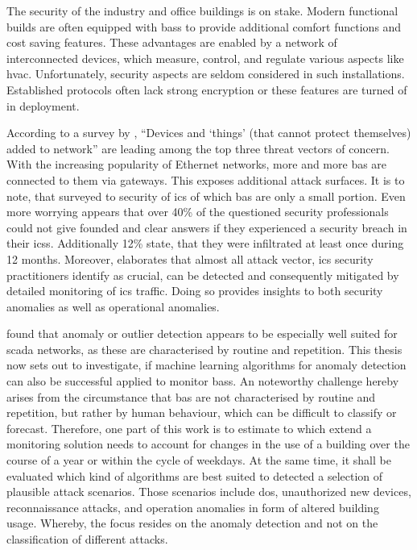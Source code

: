
The security of the industry and office buildings is on stake.
Modern functional builds are often equipped with \glspl{bas} to provide additional comfort functions and cost saving features.
These advantages are enabled by a network of interconnected devices, which measure, control, and regulate various aspects like \gls{hvac}.
Unfortunately, security aspects are seldom considered in such installations. \parencite{Brandstetter2017}
Established protocols often lack strong encryption or these features are turned of in deployment.

According to a survey by \textcite{Gregory-Brown2017}, \enquote{Devices and \enquote{things} (that cannot protect themselves) added to network} are leading among the top three threat vectors of concern.
With the increasing popularity of Ethernet networks, more and more \gls{bas} are connected to them via gateways. This exposes additional attack surfaces.
It is to note, that \textcite{Gregory-Brown2017} surveyed to security of \gls{ics} of which \gls{bas} are only a small portion.
Even more worrying appears that over 40\% of the questioned security professionals could not give founded and clear answers if they experienced a security breach in their \glspl{ics}. Additionally 12\% state, that they were infiltrated at least once during 12 months. \parencite[p.~13]{Gregory-Brown2017}
Moreover, \textcite{Gregory-Brown2017} elaborates that almost all attack vector, \gls{ics} security practitioners identify as crucial, can be detected and consequently mitigated by detailed monitoring of \gls{ics} traffic. Doing so provides insights to both security anomalies as well as operational anomalies. 

\textcite{Yang2006} found that anomaly or outlier detection appears to be especially well suited for \gls{scada} networks, as these are characterised by routine and repetition.
This thesis now sets out to investigate, if machine learning algorithms for anomaly detection can also be successful applied to monitor \glspl{bas}. An noteworthy challenge hereby arises from the circumstance that \gls{bas} are not characterised by routine and repetition, but rather by human behaviour, which can be difficult to classify or forecast.
Therefore, one part of this work is to estimate to which extend a monitoring solution needs to account for changes in the use of a building over the course of a year or within the cycle of weekdays.
At the same time, it shall be evaluated which kind of algorithms are best suited to detected a selection of plausible attack scenarios.
Those scenarios include \gls{dos}, unauthorized new devices, reconnaissance attacks, and operation anomalies in form of altered building usage.
Whereby, the focus resides on the anomaly detection and not on the classification of different attacks.

